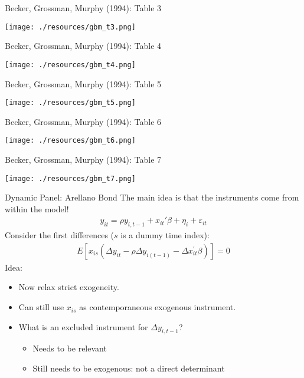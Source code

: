 \documentclass[xcolor=pdftex,dvipsnames,table,mathserif,aspectratio=169]{beamer}
\begin{document}
\begin{frame}{Becker, Grossman, Murphy (1994): Table 3}
\begin{center}
\texttt{[image: ./resources/gbm\_t3.png]}
\end{center}
\end{frame}

\begin{frame}{Becker, Grossman, Murphy (1994): Table 4}
\begin{center}
\texttt{[image: ./resources/gbm\_t4.png]}
\end{center}
\end{frame}

\begin{frame}{Becker, Grossman, Murphy (1994): Table 5}
\begin{center}
\texttt{[image: ./resources/gbm\_t5.png]}
\end{center}
\end{frame}

\begin{frame}{Becker, Grossman, Murphy (1994): Table 6}
\begin{center}
\texttt{[image: ./resources/gbm\_t6.png]}
\end{center}
\end{frame}

\begin{frame}{Becker, Grossman, Murphy (1994): Table 7}
\begin{center}
\texttt{[image: ./resources/gbm\_t7.png]}
\end{center}
\end{frame}


\begin{frame}{Dynamic Panel: Arellano Bond}
The main idea is that the \alert{instruments come from within the model}!
\begin{eqnarray*}
y_{it} = \rho y_{i,t-1} + x_{it}'\beta + \eta_i + \varepsilon_{it}
\end{eqnarray*}
Consider the first differences ($s$ is a dummy time index):
\begin{eqnarray*}
E\left[x_{i s}\left(\Delta y_{i t}-\rho \Delta y_{i(t-1)}-\Delta x_{i t}^{\prime} \beta\right)\right]=0
\end{eqnarray*}
Idea:
\begin{itemize}
\item Now relax \alert{strict exogeneity}.
\item Can still use $x_{is}$ as contemporaneous exogenous instrument.
\item What is an excluded instrument for $\Delta y_{i,t-1}$?
\begin{itemize}
\item Needs to be \alert{relevant}
\item Still needs to be \alert{exogenous}: not a direct determinant
\end{itemize}
\end{itemize}
\end{frame}
\end{document}
